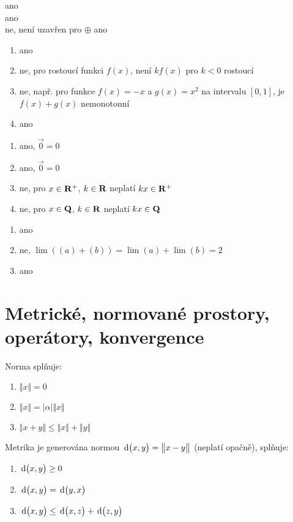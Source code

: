 \documentclass[a4paper,10pt]{book}
\def\Real{{\rm\bf R}}
\def\d{\,{\rm d}}               %
\def\abs#1{\lvert#1\rvert}
\def\norm#1{\bigl\Vert#1\bigr\Vert} %
\def\metr#1#2{\d\bigl(#1,#2\bigr)}          %
\begin{document}
 ano   \\
 ano   \\
 ne, není uzavřen pro $\oplus$ 
 ano   \\
  \begin{enumerate}[label=\alph*), itemsep=-5pt, topsep=-7pt]
    \item ano
    \item ne, pro rostoucí funkci $f(x)$, není $kf(x)$ pro $k<0$ rostoucí
    \item ne, např. pro funkce $f(x)=-x$ a $g(x)=x^2$ na intervalu $[0,1]$, je $f(x)+g(x)$   
          nemonotonní
    \item ano
  \end{enumerate}
  \begin{enumerate}[label=\alph*), itemsep=-5pt, topsep=-7pt]
    \item ano, $\vec{0}=0$
    \item ano, $\vec{0}=0$
    \item ne, pro $x\in\Real^{+}$, $k\in\Real$ neplatí $kx\in\Real^{+}$
    \item ne, pro $x\in\rm\bf{Q}$, $k\in\Real$ neplatí $kx\in\rm\bf{Q}$
  \end{enumerate}
  \begin{enumerate}[label=\alph*), itemsep=-5pt, topsep=-7pt]
    \item ano    
    \item ne, $\lim\left((a)+(b)\right) = \lim (a) + \lim(b) = 2$
    \item ano
  \end{enumerate}



\chapter{Metrické, normované prostory, operátory, konvergence}
Norma splňuje:
\begin{enumerate}[label=N), itemsep=-3pt, topsep=-7pt]
\item $\norm{x}=0$ \label{norm1}
\item $\norm{x}=\abs{\alpha}\norm{x}$ \label{norm2}
\item $\norm{x+y}\leq \norm{x} + \norm{y}$ \label{norm3}
\end{enumerate}

Metrika je generována normou $\metr{x}{y} = \norm{x-y}$ (neplatí opačně), splňuje:
\begin{enumerate}[label=M), itemsep=-3pt, topsep=-7pt]
\item $\metr{x}{y} \geq 0$
\item $\metr{x}{y} = \metr{y}{x}$
\item $\metr{x}{y}\leq \metr{x}{z} + \metr{z}{y}$
\end{enumerate}
\end{document}
